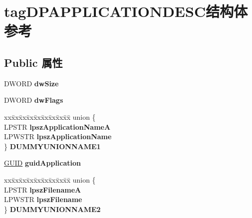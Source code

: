 \hypertarget{structtag_d_p_a_p_p_l_i_c_a_t_i_o_n_d_e_s_c}{}\section{tag\+D\+P\+A\+P\+P\+L\+I\+C\+A\+T\+I\+O\+N\+D\+E\+S\+C结构体 参考}
\label{structtag_d_p_a_p_p_l_i_c_a_t_i_o_n_d_e_s_c}
\subsection*{Public 属性}
\begin{DoxyCompactItemize}
\item 
\mbox{\label{structtag_d_p_a_p_p_l_i_c_a_t_i_o_n_d_e_s_c_a671e9edc767277aac54707cad88e241a}} 
D\+W\+O\+RD {\bfseries dw\+Size}
\item 
\mbox{\label{structtag_d_p_a_p_p_l_i_c_a_t_i_o_n_d_e_s_c_a9c199ee6b45d1ff55adcf2a481e01329}} 
D\+W\+O\+RD {\bfseries dw\+Flags}
\item 
\mbox{\label{structtag_d_p_a_p_p_l_i_c_a_t_i_o_n_d_e_s_c_a5912babec6cba5e51270fb9d20e5e9ba}} 
\begin{tabbing}
xx\=xx\=xx\=xx\=xx\=xx\=xx\=xx\=xx\=\kill
union \{\\
\>LPSTR {\bfseries lpszApplicationNameA}\\
\>LPWSTR {\bfseries lpszApplicationName}\\
\} {\bfseries DUMMYUNIONNAME1}\\

\end{tabbing}\item 
\mbox{\label{structtag_d_p_a_p_p_l_i_c_a_t_i_o_n_d_e_s_c_ac9e2b9b7c55bab2d4feb9de58ef4b293}} 
\hyperlink{interface_g_u_i_d}{G\+U\+ID} {\bfseries guid\+Application}
\item 
\mbox{\label{structtag_d_p_a_p_p_l_i_c_a_t_i_o_n_d_e_s_c_a539f6917bf04898a7948187478bcf312}} 
\begin{tabbing}
xx\=xx\=xx\=xx\=xx\=xx\=xx\=xx\=xx\=\kill
union \{\\
\>LPSTR {\bfseries lpszFilenameA}\\
\>LPWSTR {\bfseries lpszFilename}\\
\} {\bfseries DUMMYUNIONNAME2}\\


\end{tabbing}
\end{DoxyCompactItemize}
